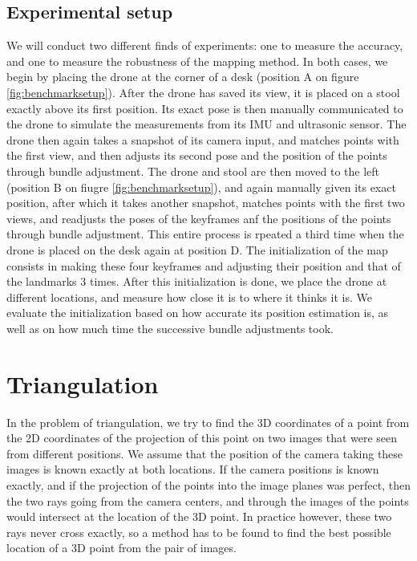 \subsection{Experimental setup}
We will conduct two different finds of experiments: one to measure the accuracy, and one to measure the robustness of the mapping method. In both cases, we begin by placing the drone at the corner of a desk (position A on figure \ref{fig:benchmarksetup}). After the drone has saved its view, it is placed on a stool exactly above its first position. Its exact pose is then manually communicated to the drone to simulate the measurements from its IMU and ultrasonic sensor. The drone then again takes a snapshot of its camera input, and matches points with the first view, and then adjusts its second pose and the position of the points through bundle adjustment. The drone and stool are then moved to the left (position B on fiugre \ref{fig:benchmarksetup}), and again manually given its exact position, after which it takes another snapshot, matches points with the first two views, and readjusts the poses of the keyframes anf the positions of the points through bundle adjustment. This entire process is rpeated a third time when the drone is placed on the desk again at position D. The initialization of the map consists in making these four keyframes and adjusting their position and that of the landmarks 3 times. After this initialization is done, we place the drone at different locations, and measure how close it is to where it thinks it is. We evaluate the initialization based on how accurate its position estimation is, as well as on how much time the successive bundle adjustments took.


\section{Triangulation}
In the problem of triangulation, we try to find the 3D coordinates of a point from the 2D coordinates of the projection of this point on two images that were seen from different positions. We assume that the position of the camera taking these images is known exactly at both locations. If the camera positions is known exactly, and if the projection of the points into the image planes was perfect, then the two rays going from the camera centers, and through the images of the points would intersect at the location of the 3D point. In practice however, these two rays never cross exactly, so a method has to be found to find the best possible location of a 3D point from the pair of images.


